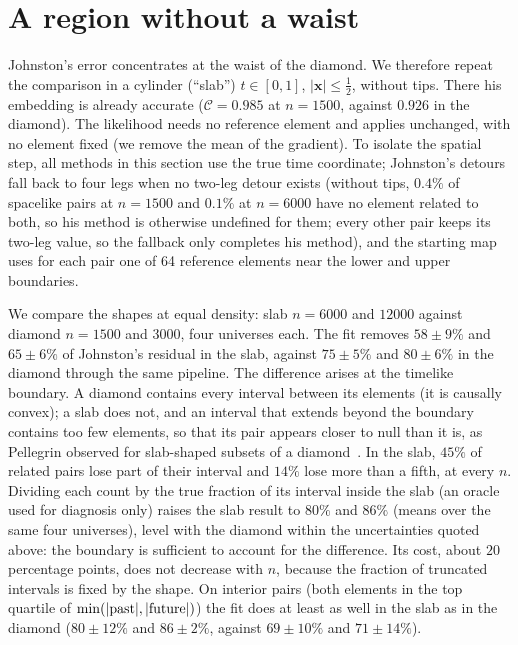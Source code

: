 \documentclass[prd,twocolumn,superscriptaddress,nofootinbib,amsmath,amssymb,floatfix]{revtex4-2}
\begin{document}
\section{A region without a waist}\label{sec:slab}
Johnston's error concentrates at the waist of the diamond. We therefore repeat the comparison in a cylinder (``slab'') $t\in[0,1]$, $|\mathbf x|\le\tfrac12$, without tips. There his embedding is already accurate ($\mathcal C=0.985$ at $n=1500$, against $0.926$ in the diamond). The likelihood needs no reference element and applies unchanged, with no element fixed (we remove the mean of the gradient). To isolate the spatial step, all methods in this section use the true time coordinate; Johnston's detours fall back to four legs when no two-leg detour exists (without tips, $0.4\%$ of spacelike pairs at $n=1500$ and $0.1\%$ at $n=6000$ have no element related to both, so his method is otherwise undefined for them; every other pair keeps its two-leg value, so the fallback only completes his method), and the starting map uses for each pair one of 64 reference elements near the lower and upper boundaries.

We compare the shapes at equal density: slab $n=6000$ and $12000$ against diamond $n=1500$ and $3000$, four universes each. The fit removes $58\pm9\%$ and $65\pm6\%$ of Johnston's residual in the slab, against $75\pm5\%$ and $80\pm6\%$ in the diamond through the same pipeline. The difference arises at the timelike boundary. A diamond contains every interval between its elements (it is causally convex); a slab does not, and an interval that extends beyond the boundary contains too few elements, so that its pair appears closer to null than it is, as Pellegrin observed for slab-shaped subsets of a diamond~\cite{Pellegrin26}. In the slab, $45\%$ of related pairs lose part of their interval and $14\%$ lose more than a fifth, at every $n$. Dividing each count by the true fraction of its interval inside the slab (an oracle used for diagnosis only) raises the slab result to $80\%$ and $86\%$ (means over the same four universes), level with the diamond within the uncertainties quoted above: the boundary is sufficient to account for the difference. Its cost, about $20$ percentage points, does not decrease with $n$, because the fraction of truncated intervals is fixed by the shape. On interior pairs (both elements in the top quartile of $\min(|{\rm past}|,|{\rm future}|)$) the fit does at least as well in the slab as in the diamond ($80\pm12\%$ and $86\pm2\%$, against $69\pm10\%$ and $71\pm14\%$).
\end{document}
